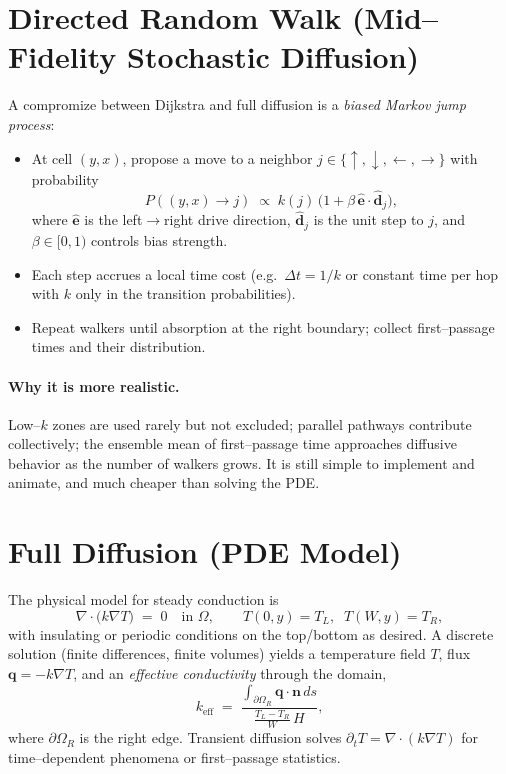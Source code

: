 \documentclass[11pt,a4paper]{article}
\begin{document}
\section{Directed Random Walk (Mid--Fidelity Stochastic Diffusion)}
A compromize between Dijkstra and full diffusion is a \emph{biased Markov jump process}:
\begin{itemize}
  \item At cell $(y,x)$, propose a move to a neighbor $j\in\{\uparrow,\downarrow,\leftarrow,\rightarrow\}$ with probability
  \[
    P((y,x)\!\to\! j) \;\propto\; k(j)\,\Big(1+\beta\,\hat{\mathbf e}\!\cdot\!\hat{\mathbf d}_{j}\Big),
  \]
  where $\hat{\mathbf e}$ is the left$\to$right drive direction, $\hat{\mathbf d}_{j}$ is the unit step to $j$, and $\beta\in[0,1)$ controls bias strength.
  \item Each step accrues a local time cost (e.g.\ $\Delta t=1/k$ or constant time per hop with $k$ only in the transition probabilities).
  \item Repeat walkers until absorption at the right boundary; collect first--passage times and their distribution.
\end{itemize}
\paragraph{Why it is more realistic.} Low--$k$ zones are used rarely but not excluded; parallel pathways contribute collectively; the ensemble mean of first--passage time approaches diffusive behavior as the number of walkers grows. It is still simple to implement and animate, and much cheaper than solving the PDE.

\section{Full Diffusion (PDE Model)}
The physical model for steady conduction is
\[
    \nabla\!\cdot\!\big(k\nabla T\big) \;=\; 0
    \quad\text{in }\Omega,\qquad
    T(0,y)=T_L,\;\; T(W,y)=T_R,
\]
with insulating or periodic conditions on the top/bottom as desired. A discrete solution (finite differences, finite volumes) yields a temperature field $T$, flux $\mathbf q=-k\nabla T$, and an \emph{effective conductivity} through the domain,
\[
    k_{\text{eff}} \;=\; \frac{\displaystyle \int_{\partial\Omega_R} \mathbf q\!\cdot\!\mathbf n\,ds}{\displaystyle \frac{T_L - T_R}{W}\,H},
\]
where $\partial\Omega_R$ is the right edge. Transient diffusion solves $\partial_t T=\nabla\!\cdot(k\nabla T)$ for time--dependent phenomena or first--passage statistics.
\end{document}
